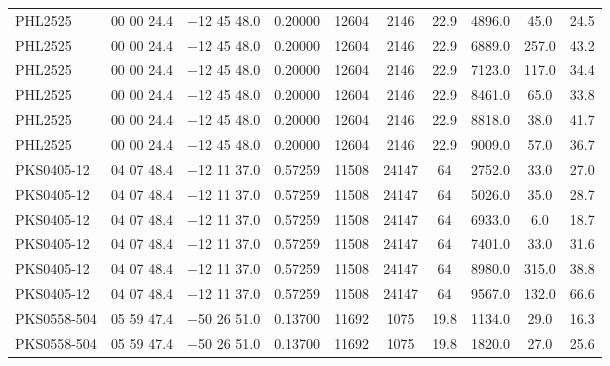 \begin{landscape}
\begin{center}
\begin{longtable}{l c c c c c c c c c}
PHL2525  &                 00 00 24.4  &         $-$12 45 48.0  &       0.20000  & 12604  &   2146  &       22.9  &      4896.0  &  45.0  &   24.5  \\
PHL2525  &                 00 00 24.4  &         $-$12 45 48.0  &       0.20000  & 12604  &   2146  &       22.9  &      6889.0  &  257.0  &  43.2  \\
PHL2525  &                 00 00 24.4  &         $-$12 45 48.0  &       0.20000  & 12604  &   2146  &       22.9  &      7123.0  &  117.0  &  34.4  \\
PHL2525  &                 00 00 24.4  &         $-$12 45 48.0  &       0.20000  & 12604  &   2146  &       22.9  &      8461.0  &  65.0  &   33.8  \\
PHL2525  &                 00 00 24.4  &         $-$12 45 48.0  &       0.20000  & 12604  &   2146  &       22.9  &      8818.0  &  38.0  &   41.7  \\
PHL2525  &                 00 00 24.4  &         $-$12 45 48.0  &       0.20000  & 12604  &   2146  &       22.9  &      9009.0  &  57.0  &   36.7  \\
PKS0405-12  &              04 07 48.4  &         $-$12 11 37.0  &       0.57259  & 11508  &   24147  &      64  &        2752.0  &  33.0  &   27.0  \\
PKS0405-12  &              04 07 48.4  &         $-$12 11 37.0  &       0.57259  & 11508  &   24147  &      64  &        5026.0  &  35.0  &   28.7  \\
PKS0405-12  &              04 07 48.4  &         $-$12 11 37.0  &       0.57259  & 11508  &   24147  &      64  &        6933.0  &  6.0  &    18.7  \\
PKS0405-12  &              04 07 48.4  &         $-$12 11 37.0  &       0.57259  & 11508  &   24147  &      64  &        7401.0  &  33.0  &   31.6  \\
PKS0405-12  &              04 07 48.4  &         $-$12 11 37.0  &       0.57259  & 11508  &   24147  &      64  &        8980.0  &  315.0  &  38.8  \\
PKS0405-12  &              04 07 48.4  &         $-$12 11 37.0  &       0.57259  & 11508  &   24147  &      64  &        9567.0  &  132.0  &  66.6  \\
PKS0558-504  &             05 59 47.4  &         $-$50 26 51.0  &       0.13700  & 11692  &   1075  &       19.8  &      1134.0  &  29.0  &   16.3  \\
PKS0558-504  &             05 59 47.4  &         $-$50 26 51.0  &       0.13700  & 11692  &   1075  &       19.8  &      1820.0  &  27.0  &   25.6  \\

\end{longtable}
\end{center}
\end{landscape}
